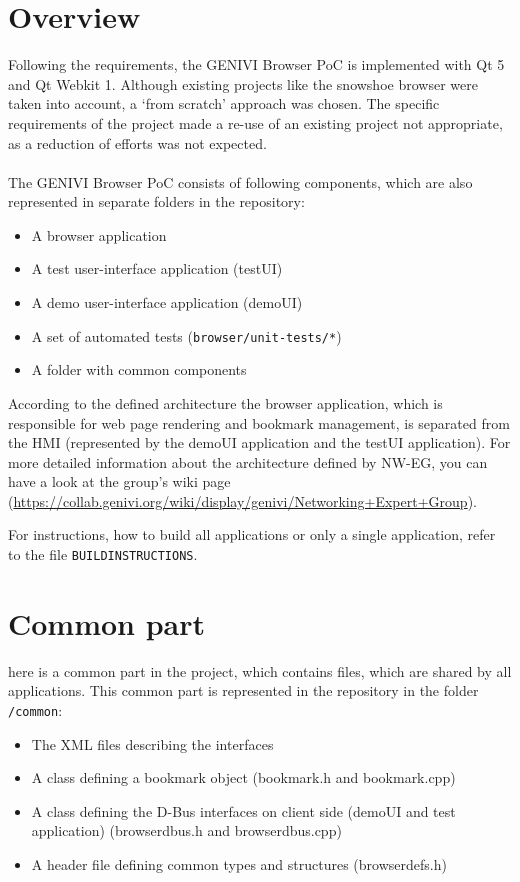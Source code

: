 \documentclass{pelagicore}
\begin{document}
\section{Overview}
Following the requirements, the GENIVI Browser PoC is implemented with Qt 5 and
Qt Webkit 1. Although existing projects like the snowshoe browser were taken
into account, a `from scratch' approach was chosen. The specific requirements
of the project made a re-use of an existing project not appropriate, as a
reduction of efforts was not expected.
\\\\
The GENIVI Browser PoC consists of following components, which are also represented in
separate folders in the repository:

\begin{itemize}
    \item A browser application
    \item A test user-interface application (testUI)
    \item A demo user-interface application (demoUI)
    \item A set of automated tests ({\tt browser/unit-tests/*})
    \item A folder with common components
\end{itemize}

According to the defined architecture the browser application, which is
responsible for web page rendering and bookmark management, is separated from
the HMI (represented by the demoUI application and the testUI application). For
more detailed information about the architecture defined by NW-EG, you can have
a look at the group's wiki page
(\url{https://collab.genivi.org/wiki/display/genivi/Networking+Expert+Group}).

For instructions, how to build all applications or only a single application,
refer to the file {\tt BUILDINSTRUCTIONS}.

\section {Common part}
here is a common part in the project, which contains files, which are shared by
all applications. This common part is represented in the repository in the
folder {\tt /common}:

\begin{itemize}
    \item The XML files describing the interfaces
    \item A class defining a bookmark object (bookmark.h and bookmark.cpp)
    \item A class defining the D-Bus interfaces on client side (demoUI and test
          application) (browserdbus.h and browserdbus.cpp)
    \item A header file defining common types and structures (browserdefs.h)
\end{itemize}
\end{document}
